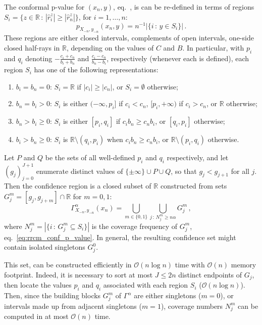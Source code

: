\documentclass[conference]{IEEEtran}
\newcommand{\BigO}{\mathcal{O}}
\newcommand{\Real}{\mathbb{R}}
\begin{document}
The conformal p-value for $(x_n, y)$, eq.~\label{eq:conf_p_value}, is can be re-defined in terms
of regions $S_i = \{z\in\Real\,:\, |\hat{r}_i^z| \geq |\hat{r}_n^z|\}$, for $i=1,\ldots, n$:
\begin{equation} \label{eq:rrcm_conf_p_value}
  p_{X_{-n}, y_{-n}}(x_n, y) = n^{-1} \bigl\lvert\{ i \,:\, y \in S_i \}\bigr\rvert \,.
\end{equation}
These regions are either closed intervals, complements of open intervals, one-side
closed half-rays in $\Real$, depending on the values of $C$ and $B$. In particular,
with $p_i$ and $q_i$ denoting $-\frac{c_i+c_n}{b_i+b_n}$ and $\frac{c_i-c_n}{b_n-b_i}$,
respectively (whenever each is defined), each region $S_i$ has one of the following
representations:
\begin{enumerate}
  \item $b_i=b_n=0$: $S_i = \Real$ if $|c_i| \geq |c_n|$, or $S_i = \emptyset$
  otherwise;
  \item $b_n = b_i > 0$: $S_i$ is either $(-\infty, p_i]$ if $c_i < c_n$, $[p_i, +\infty)$ if
  $c_i > c_n$, or $\Real$ otherwise;
  \item $b_n > b_i \geq 0$: $S_i$ is either $[p_i, q_i]$ if $c_i b_n \geq c_n b_i$,
  or $[q_i, p_i]$ otherwise;
  \item $b_i > b_n \geq 0$: $S_i$ is $\Real\setminus (q_i, p_i)$ when $c_i b_n \geq c_n b_i$,
  or $\Real\setminus (p_i, q_i)$ otherwise.
\end{enumerate}
Let $P$ and $Q$ be the sets of all well-defined $p_i$ and $q_i$ respectively, and
let $(g_j)_{j=0}^{J+1}$ enumerate distinct values of $\{\pm\infty\} \cup P \cup Q$,
so that $g_j < g_{j+1}$ for all $j$. Then the confidence region is a closed subset
of $\Real$ constructed from sets $G^m_j = [g_j, g_{j+m}]\cap \Real$ for $m=0, 1$:
\begin{equation} \label{eq:rrcm_conf_ci}
  \Gamma_{X_{-n}, y_{-n}}^\alpha(x_n)
    = \bigcup_{m\in\{0,1\}} \bigcup_{j\,:\, N^m_j \geq n \alpha} G^m_j
    \,,
\end{equation}
where $N^m_j = |\{i \,:\, G^m_j \subseteq S_i\}|$ is the coverage frequency of $G^m_j$,
eq.~\ref{eq:rrcm_conf_p_value}. In general, the resulting confidence set might contain
isolated singletons $G^0_j$.

This set, can be constructed efficiently in $\BigO(n \log{} n)$ time with $\BigO(n)$
memory footprint. Indeed, it is necessary to sort at most $J\leq 2n$ distinct endpoints
of $G_j$, then locate the values $p_i$ and $q_i$ associated with each region $S_i$
($\BigO(n \log{} n)$). Then, since the building blocks $G^m_j$ of $\Gamma^\alpha$
are either singletons ($m=0$), or intervals made up from adjacent singletons ($m=1$),
coverage numbers $N^m_j$ can be computed in at most $\BigO(n)$ time.
\end{document}
